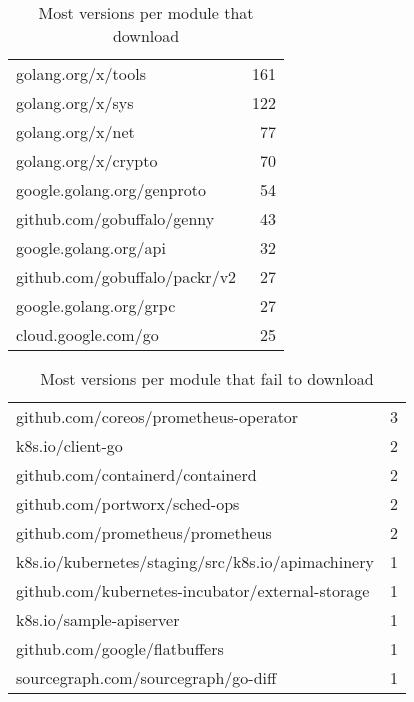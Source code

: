 \begin{table}[ht]
\caption{Most versions per module that  download}
\label{table:versions}
\begin{tabular}{|l|r|}
\hline
 golang.org/x/tools & 161 \\
 golang.org/x/sys & 122 \\
 golang.org/x/net & 77 \\
 golang.org/x/crypto & 70 \\
 google.golang.org/genproto & 54 \\
 github.com/gobuffalo/genny & 43 \\
 google.golang.org/api & 32 \\
 github.com/gobuffalo/packr/v2 & 27 \\
 google.golang.org/grpc & 27 \\
 cloud.google.com/go & 25 \\
\hline
\end{tabular}
\end{table}
\begin{table}[ht]
\caption{Most versions per module that fail to download}
\label{table:versions}
\begin{tabular}{|l|r|}
\hline
 github.com/coreos/prometheus-operator & 3 \\
 k8s.io/client-go & 2 \\
 github.com/containerd/containerd & 2 \\
 github.com/portworx/sched-ops & 2 \\
 github.com/prometheus/prometheus & 2 \\
 k8s.io/kubernetes/staging/src/k8s.io/apimachinery & 1 \\
 github.com/kubernetes-incubator/external-storage & 1 \\
 k8s.io/sample-apiserver & 1 \\
 github.com/google/flatbuffers & 1 \\
 sourcegraph.com/sourcegraph/go-diff & 1 \\
\hline
\end{tabular}
\end{table}
